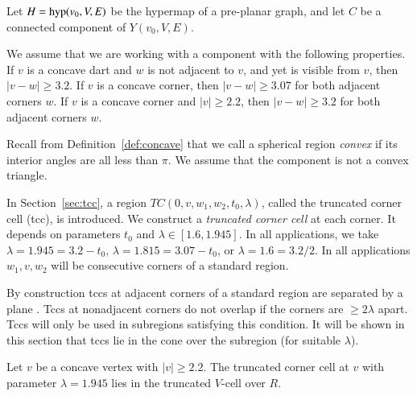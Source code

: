 Let $H ={\operatorname{hyp}}(v_0,V,E)$ be the hypermap of a pre-planar graph,
and let $C$ be a connected component
of $Y(v_0,V,E)$.

We assume
that we are working with a component
with the following properties. If $v$ is a concave dart and $w$
is not adjacent to $v$, and yet is visible from $v$, then
$|v-w|\ge3.2$. If $v$ is a concave corner, then $|v-w|\ge3.07$ for
both adjacent corners $w$. If $v$ is a concave corner and
$|v|\ge2.2$, then $|v-w|\ge3.2$ for both adjacent corners $w$.


Recall from Definition~\ref{def:concave} that we call a spherical
region {\it convex} if its interior angles are all less than
$\pi$. 
We assume
that the component is
not a convex triangle.

In Section~\ref{sec:tcc}, a region $TC(0,v,w_1,w_2,t_0,\lambda)$,
called the
truncated corner cell (tcc), is introduced.
We construct a {\it truncated corner cell\/} at each corner.  It depends on 
parameters $t_0$ and $\lambda \in [1.6,1.945]$. In all applications, we
take
    $\lambda = 1.945 = 3.2-t_0$, $\lambda = 1.815 = 3.07-t_0$, or
    $\lambda = 1.6 = 3.2/2$.
In all applications $w_1,v,w_2$ will be consecutive corners of
a standard region.

By construction tccs at adjacent
corners of a standard region are separated by a plane . Tccs at
nonadjacent corners do not overlap if the corners are
$\ge2\lambda$ apart. Tccs will only be used in subregions
satisfying this condition. It will be shown in
this section that tccs lie in the cone over the subregion
(for suitable $\lambda$).

\begin{lemma}
Let $v$ be a concave vertex with $|v|\ge2.2$. The truncated
corner cell at $v$ with parameter $\lambda=1.945$ lies in the truncated
$V$-cell over $R$.
\end{lemma}

